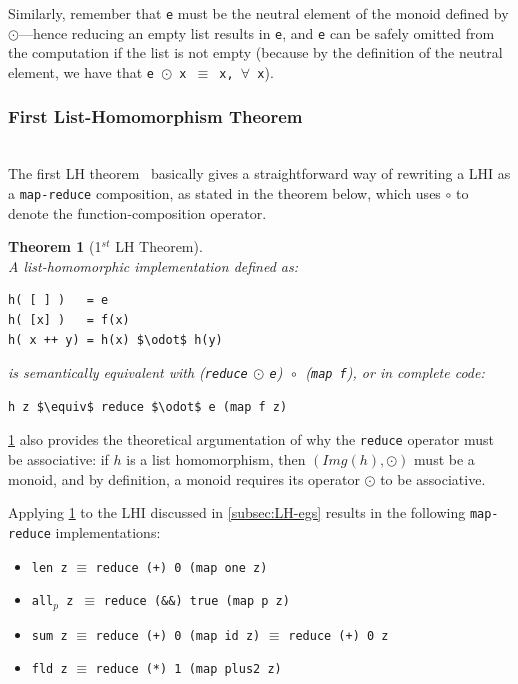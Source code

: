 \documentclass[acmsmall,review]{acmart}\settopmatter{printfolios=true,printccs=false,printacmref=false}
\newtheorem{mytheo}{Theorem}
\begin{document}
Similarly, remember that {\tt e} must be the neutral element of the 
monoid defined by $\odot$---hence reducing an empty list results in 
{\tt e}, and {\tt e} can be safely omitted from the computation if 
the list is not empty (because by the definition of the neutral 
element, we have that {\tt e $\odot$ x $\equiv$ x, $\forall$ x}).

\subsubsection{First List-Homomorphism Theorem}
$\mbox{ }$\\

The first LH theorem~\cite{ThirdLHTh} basically gives a 
straightforward way of rewriting a LHI as a \lstinline{map-reduce} 
composition, as stated in the theorem below, which uses $\circ$ 
to denote the function-composition operator.

\begin{mytheo}[1$^{st}$ LH Theorem]\label{1st-LH-TH}
$\mbox{ }$\\
A list-homomorphic implementation defined as:
\begin{lstlisting}[mathescape=true]
h( [ ] )   = e
h( [x] )   = f(x)
h( x ++ y) = h(x) $\odot$ h(y)
\end{lstlisting}\vspace{-2ex}
is semantically equivalent with
(\lstinline{reduce}$~\odot~$\lstinline{e})$~~\circ~~$(\lstinline{map f}),
or in complete code:
\begin{lstlisting}[mathescape=true]
h z $\equiv$ reduce $\odot$ e (map f z)
\end{lstlisting}\vspace{-2ex}
\end{mytheo}

\cref{1st-LH-TH} also provides the theoretical argumentation of why the
\lstinline{reduce} operator must be associative: if $h$ is a list
homomorphism, then $(Img(h),\odot)$ must be a monoid, and by definition,
a monoid requires its operator $\odot$ to be associative.

Applying \cref{1st-LH-TH} to the LHI discussed in \cref{subsec:LH-egs}
results in the following \lstinline{map-reduce} implementations:
\begin{itemize}
    \item \lstinline{len z} $\equiv$ \lstinline{reduce (+) 0 (map one z)}
    \item {\tt all$_p$ z $\equiv$} \lstinline{reduce (&&) true (map p z)}
    \item \lstinline{sum z} $\equiv$ \lstinline{reduce (+) 0 (map id z)} $\equiv$ \lstinline{reduce (+) 0 z}
    \item \lstinline{fld z} $\equiv$ \lstinline{reduce (*) 1 (map plus2 z)}
\end{itemize}
\end{document}
